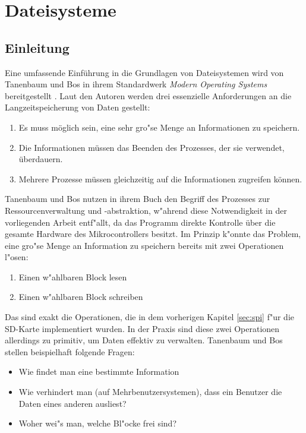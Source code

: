 \documentclass[11pt]{article}
\begin{document}
\section{Dateisysteme}
\subsection{Einleitung}
Eine umfassende Einführung in die Grundlagen von Dateisystemen wird 
von Tanenbaum und Bos in ihrem Standardwerk \textit{Modern Operating Systems} bereitgestellt \cite[S.~263 ff.]{tanenbaum2015}.
Laut den Autoren werden drei essenzielle Anforderungen an die Langzeitspeicherung von Daten gestellt:
\begin{enumerate}
    \item Es muss möglich sein, eine sehr gro"se Menge an Informationen zu speichern.
    \item Die Informationen müssen das Beenden des Prozesses, der sie verwendet, überdauern.
    \item Mehrere Prozesse müssen gleichzeitig auf die Informationen zugreifen können.
\end{enumerate}

Tanenbaum und Bos nutzen in ihrem Buch den Begriff des Prozesses zur Ressourcenverwaltung und -abstraktion, 
w"ahrend diese Notwendigkeit in der vorliegenden Arbeit entf"allt, 
da das Programm direkte Kontrolle über die gesamte Hardware des Mikrocontrollers besitzt.
Im Prinzip k"onnte das Problem, eine gro"se Menge an Information zu speichern bereits mit zwei Operationen
l"osen:
\begin{enumerate}
    \item Einen w"ahlbaren Block lesen
    \item Einen w"ahlbaren Block schreiben
\end{enumerate}

Das sind exakt die Operationen, die in dem vorherigen Kapitel \ref{sec:spi} f"ur die SD-Karte implementiert wurden.
In der Praxis sind diese zwei Operationen allerdings zu primitiv, um Daten effektiv zu verwalten.
Tanenbaum und Bos stellen beispielhaft folgende Fragen:
\begin{itemize}
    \item Wie findet man eine bestimmte Information
    \item Wie verhindert man (auf Mehrbenutzersystemen), dass ein Benutzer die Daten eines anderen ausliest?
    \item Woher wei"s man, welche Bl"ocke frei sind?
\end{itemize}
\end{document}
